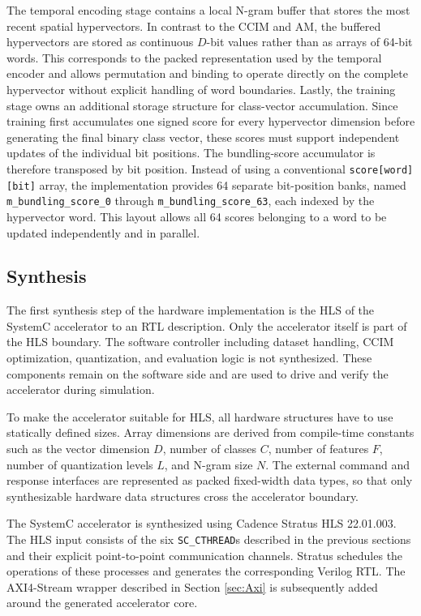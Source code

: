 The temporal encoding stage contains a local N-gram buffer that stores the most recent spatial hypervectors. In contrast to the CCIM and AM, the buffered hypervectors are stored as continuous $D$-bit values rather than as arrays of 64-bit words. This corresponds to the packed representation used by the temporal encoder and allows permutation and binding to operate directly on the complete hypervector without explicit handling of word boundaries.
Lastly, the training stage owns an additional storage structure for class-vector accumulation. Since training first accumulates one signed score for every hypervector dimension before generating the final binary class vector, these scores must support independent updates of the individual bit positions. The bundling-score accumulator is therefore transposed by bit position. Instead of using a conventional \texttt{score[word][bit]} array, the implementation provides 64 separate bit-position banks, named \texttt{m\_bundling\_score\_0} through \texttt{m\_bundling\_score\_63}, each indexed by the hypervector word. This layout allows all 64 scores belonging to a word to be updated independently and in parallel.

\subsection{Synthesis}

The first synthesis step of the hardware implementation is the \ac{HLS} of the SystemC accelerator to an RTL description. Only the accelerator itself is part of the HLS boundary. The software controller including dataset handling, CCIM optimization, quantization, and evaluation logic is not synthesized. These components remain on the software side and are used to drive and verify the accelerator during simulation.

To make the accelerator suitable for HLS, all hardware structures have to use statically defined sizes. Array dimensions are derived from compile-time constants such as the vector dimension $D$, number of classes $C$, number of features $F$, number of quantization levels $L$, and N-gram size $N$. The external command and response interfaces are represented as packed fixed-width data types, so that only synthesizable hardware data structures cross the accelerator boundary.

The SystemC accelerator is synthesized using Cadence Stratus HLS 22.01.003. 
The HLS input consists of the six \texttt{SC\_CTHREAD}s described in the previous sections and their explicit point-to-point communication channels. Stratus schedules the operations of these processes and generates the corresponding Verilog RTL. The AXI4-Stream wrapper described in Section \ref{sec:Axi} is subsequently added around the generated accelerator core.

